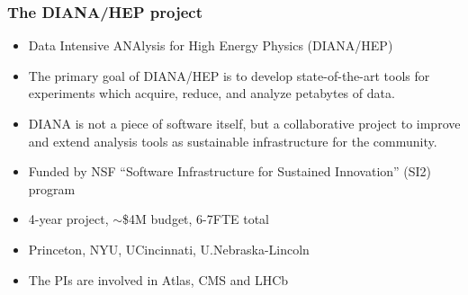 \begin{frame}
\frametitle{The DIANA/HEP project}

\begin{itemize}
\item Data Intensive ANAlysis for High Energy Physics (DIANA/HEP)
\item The primary goal of DIANA/HEP is to develop state-of-the-art tools for experiments which acquire, reduce, and analyze petabytes of data.
\item DIANA is not a piece of software itself, but a collaborative project to improve and extend analysis tools as sustainable infrastructure for the community.
\item Funded by NSF ``Software Infrastructure for Sustained Innovation'' (SI2) program
\item 4-year project, $\sim$\$4M budget, 6-7FTE total
\item Princeton, NYU, UCincinnati, U.Nebraska-Lincoln
\item The PIs are involved in Atlas, CMS and LHCb
\end{itemize}

\end{frame}


